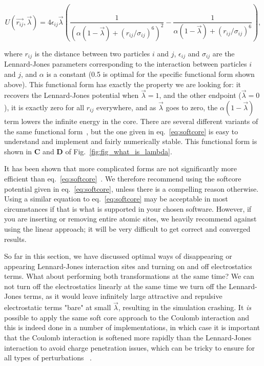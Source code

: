 \documentclass[9pt,bestpractices]{livecoms}
\begin{document}
\begin{equation}
    U(\vec{r_{ij}},\vec{\lambda}) = 4\epsilon_{ij} \vec{\lambda} \left(\frac{1}{(\alpha(1-\vec{\lambda}) + (r_{ij}/\sigma_{ij})^6)^2} -  \frac{1}{\alpha(1-\vec{\lambda}) + (r_{ij}/\sigma_{ij})^6}\right)
    \label{eq:softcore},
\end{equation}

where $r_{ij}$ is the distance between two particles $i$ and $j$, $\epsilon_{ij}$ and $\sigma_{ij}$ are the Lennard-Jones parameters corresponding to the interaction between particles $i$ and $j$, and $\alpha$ is a constant (0.5 is optimal for the specific functional form shown above). This functional form has exactly the property we are looking for: it recovers the Lennard-Jones potential when $\vec{\lambda}=1$, and the other endpoint ($\vec{\lambda}=0$), it is exactly zero for all $r_{ij}$ everywhere, and as $\vec{\lambda}$ goes to zero, the $\alpha(1-\vec{\lambda})$ term lowers the infinite energy in the core. There are several different variants of the same functional form~\cite{zacharias1994separationshifted, beutler1994avoiding,pham2011identifying}, but the one given in eq.~\ref{eq:softcore} is easy to understand and implement and fairly numerically stable. This functional form is shown in \textbf{C} and \textbf{D} of Fig.~\ref{fig:fig_what_is_lambda}.

It has been shown that more complicated forms are not significantly more efficient than eq.~\ref{eq:softcore}~\cite{pham2012optimal}. We therefore recommend using the softcore potential given in eq.~\ref{eq:softcore}, unless there is a compelling reason otherwise. Using a similar equation to eq.~\ref{eq:softcore} may be acceptable in most circumstances if that is what is supported in your chosen software. However, if you are inserting or removing entire atomic sites, we heavily recommend against using the linear approach; it will be very difficult to get correct and converged results. 

So far in this section, we have discussed optimal ways of disappearing or appearing Lennard-Jones interaction sites and turning on and off electrostatics terms. What about performing both transformations at the same time? We can not turn off the electrostatics linearly at the same time we turn off the Lennard-Jones terms, as it would leave infinitely large attractive and repulsive electrostatic terms "bare" at small $\vec{\lambda}$, resulting in the simulation crashing. It \textit{is} possible to apply the same soft core approach to the Coulomb interaction and this is indeed done in a number of implementations, in which case it is important that the Coulomb interaction is softened more rapidly than the Lennard-Jones interaction to avoid charge penetration issues, which  can be tricky to ensure for all types of perturbations ~\cite{steinbrecher2011softcore}. 
\end{document}
